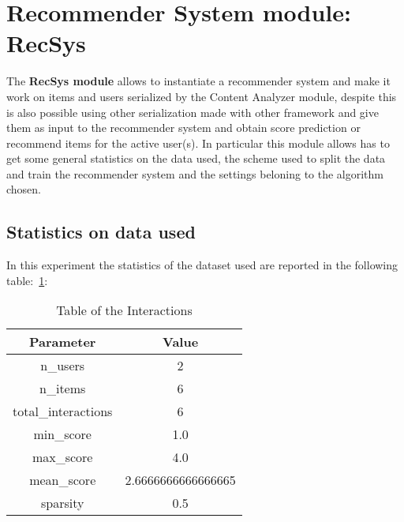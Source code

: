 \documentclass[11pt]{article}
\begin{document}
\section{Recommender System module: RecSys}\label{sec:recsys}
The \textbf{RecSys module} allows to instantiate a recommender system and make it work on items and users serialized
by the Content Analyzer module, despite this is also possible using other serialization made with other framework and
give them as input to the recommender system and obtain score prediction or recommend items for the active user(s).
In particular this module allows has to get some general statistics on the data used, the scheme used to split the data
and train the recommender system and the settings beloning to the algorithm chosen.
\hfill\break
\hfill\break

\subsection{Statistics on data used}\label{subsec:stats}
In this experiment the statistics of the dataset used are reported in the following table:~\ref{tab:dataset_table}:
\begin{table}[ht]
    \centering
  \begin{tabular}{|c|c|}
    \hline
    \textbf{Parameter}& \textbf{Value} \\ \hline
    n\_users  & 2\\ \hline
    n\_items  & 6\\ \hline
    total\_interactions  & 6\\ \hline
    min\_score  & 1.0\\ \hline
    max\_score  & 4.0\\ \hline
    mean\_score  & 2.6666666666666665\\ \hline
    sparsity  & 0.5\\ \hline
  \end{tabular}
   \caption{Table of the Interactions}\label{tab:dataset_table}
\end{table}
\hfill\break
\hfill\break


\end{document}
